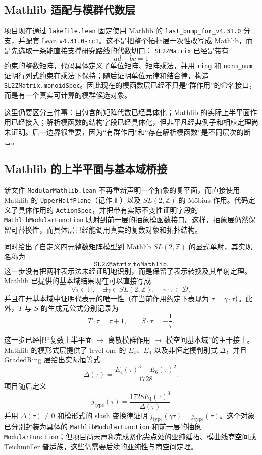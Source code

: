 \documentclass[UTF8,fontset=none,a4paper,11pt]{ctexart}
\begin{document}
\subsection{Mathlib 适配与模群代数层}

项目现在通过 \texttt{lakefile.lean} 固定使用 Mathlib 的
\texttt{last\_bump\_for\_v4.31.0} 分支，并配套 Lean
\texttt{v4.31.0-rc1}。这不是把整个拓扑层一次性改写成 Mathlib，而是先选取一条能直接支撑研究路线的代数切口：
\texttt{SL2ZMatrix} 已经是带有
\[
  ad-bc=1
\]
约束的整数矩阵，代码具体定义了单位矩阵、矩阵乘法，并用 \texttt{ring} 和
\texttt{norm\_num} 证明行列式约束在乘法下保持；随后证明单位元律和结合律，构造
\texttt{SL2ZMatrix.monoidSpec}。因此现在的模函数层已经不只是“群作用”的命名接口，而是有一个真实可计算的模群候选对象。

这里仍要区分三件事：自包含的矩阵代数已经具体化；Mathlib 的实际上半平面作用已经接入；解析模函数的结构字段已经具体化，但非平凡经典例子和相应定理尚未证明。后一边界很重要，因为“有群作用”和“存在解析模函数”是不同层次的断言。

\subsection{Mathlib 的上半平面与基本域桥接}

新文件 \texttt{ModularMathlib.lean} 不再重新声明一个抽象的复平面，而直接使用 Mathlib 的
\texttt{UpperHalfPlane}（记作 \(\mathbb H\)）以及 \(SL(2,\mathbb Z)\) 的 Möbius 作用。代码定义了具体作用的 \texttt{ActionSpec}，并把带有实际不变性证明字段的 \texttt{MathlibModularFunction} 映射到前一层的抽象模函数接口。这样，抽象层仍然保留可替换性，而具体层已经能调用真实的复数对象和拓扑结构。

同时给出了自定义四元整数矩阵模型到 Mathlib
\(SL(2,\mathbb Z)\) 的显式单射，其实现名称为
\[
\texttt{SL2ZMatrix.toMathlib}.
\]
这一步没有把两种表示法未经证明地识别，而是保留了表示转换及其单射定理。Mathlib 已提供的基本域结果现在可以直接写成
\[
  \forall\tau\in\mathbb H,\quad
  \exists\gamma\in SL(2,\mathbb Z),\quad
  \gamma\cdot\tau\in\mathcal D,
\]
并且在开基本域中证明代表元的唯一性（在当前作用约定下表现为 \(\tau=\gamma\cdot\tau\)）。此外，\(T\) 与 \(S\) 的生成元公式分别记录为
\[
  T\cdot\tau=\tau+1,\qquad
  S\cdot\tau=-\frac{1}{\tau}.
\]

这一步已经把“复数上半平面 \(\to\) 离散模群作用 \(\to\) 模空间基本域”的主干接上。Mathlib 的模形式层提供了 level-one 的 \(E_4\)、\(E_6\) 以及非恒定模判别式 \(\Delta\)，并且 GradedRing 层给出实际恒等式
\[
  \Delta(\tau)=\frac{E_4(\tau)^3-E_6(\tau)^2}{1728}.
\]
项目随后定义
\[
  j_{\mathrm{type}}(\tau)=\frac{1728E_4(\tau)^3}{\Delta(\tau)}
\]
并用 \(\Delta(\tau)\ne0\) 和模形式的 slash 变换律证明
\(j_{\mathrm{type}}(\gamma\tau)=j_{\mathrm{type}}(\tau)\)。这个对象已分别封装为具体的
\texttt{MathlibModularFunction} 和前一层的抽象 \texttt{ModularFunction}；但项目尚未声称完成紧化尖点处的亚纯延拓、模曲线商空间或 Teichmüller 普适族，这些仍需要后续的亚纯性与商空间定理。
\end{document}
